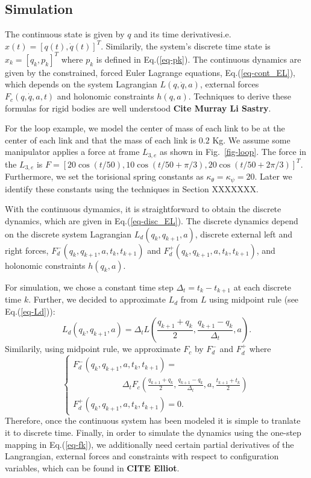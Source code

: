 \documentclass[letterpaper, 10pt, conference]{ieeeconf}
\begin{document}
\subsection{Simulation}
The continuous state is given by $q$ and its time derivatives\textemdash i.e. $x(t) = [q(t),\dot{q}(t)]^T$.  Similarily, the system's discrete time state is $x_k = [q_k,p_k]^T$ where $p_k$ is defined in Eq.(\ref{eq-pk}).   The continuous dynamics are given by the constrained, forced Euler Lagrange equations, Eq.(\ref{eq-cont_EL}), which depends on the system Lagrangian $L(q,\dot{q},a)$, external forces $F_c(q,\dot{q},a,t)$ and holonomic constraints $h(q,a)$. Techniques to derive these formulas for rigid bodies are well understood \textbf{Cite Murray Li Sastry}.  

For the loop example, we model the center of mass of each link to be at the center of each link and that the mass of each link is $0.2$ Kg.  We assume some manipulator applies a force at frame $L_{3,e}$ as shown in Fig.~\ref{fig-loop}.  The force in the $L_{3,e}$ is $F = [20 \cos(t/50), 10 \cos(t/50 + \pi/3), 20 \cos(t/50 + 2\pi/3)]^T$.  Furthermore, we set the torisional spring constants as $\kappa_\theta = \kappa_\psi = 20$.  Later we identify these constants using the techniques in Section XXXXXXX.  

With the continuous dymamics, it is straightforward to obtain the discrete dynamics, which are given in Eq.(\ref{eq-disc_EL}).  The discrete dynamics depend on the discrete system Lagrangian $L_d(q_{k},q_{k+1},a)$, discrete external left and right forces, $F_d^-(q_{k},q_{k+1},a,t_k,t_{k+1})$ and $F_d^+(q_{k},q_{k+1},a,t_k,t_{k+1})$, and holonomic constraints $h(q_k,a)$.  

For simulation, we chose a constant time step $\Delta_t = t_k - t_{k+1}$ at each discrete time $k$.  Further, we decided to approximate $L_d$ from $L$ using midpoint rule (see Eq.(\ref{eq-Ld})):
\begin{equation}
L_d(q_k,q_{k+1},a) = \Delta_t L(\frac{q_{k+1}+q_k}{2},\frac{q_{k+1}-q_k}{\Delta_t},a).
\label{eq-Ld}
\end{equation}
Similarily, using midpoint rule, we approximate $F_c$ by $F_d^-$ and $F_d^+$ where
\begin{equation}
\left\{
\begin{array}{l}
F_d^-(q_k,q_{k+1},a,t_k,t_{k+1}) = \\\hspace{70pt}\Delta_t F_c(\frac{q_{k+1}+q_k}{2},\frac{q_{k+1}-q_k}{\Delta_t},a,\frac{t_{k+1}+t_k}{2})\\
F_d^+(q_k,q_{k+1},a,t_k,t_{k+1}) = 0.
\end{array}
\right.
\label{eq-Fd}
\end{equation}
Therefore, once the continuous system has been modeled it is simple to tranlate it to discrete time.  Finally, in order to simulate the dynamics using the one-step mapping in Eq.(\ref{eq-fk}), we additionally need certain partial derivatives of the Langrangian, external forces and constraints with respect to configuration variables, which can be found in \textbf{CITE Elliot}.  
\end{document}
